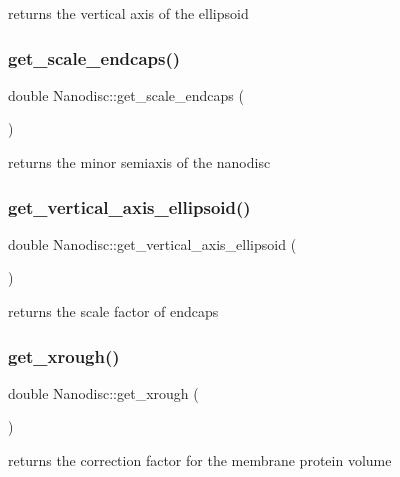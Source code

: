 returns the vertical axis of the ellipsoid \mbox{\label{class_nanodisc_ac6f2cccbdec425c9a4fc59d11393bcd1}} 
\subsubsection{\texorpdfstring{get\_scale\_endcaps()}{get\_scale\_endcaps()}}
{\footnotesize\ttfamily double Nanodisc\+::get\+\_\+scale\+\_\+endcaps (\begin{DoxyParamCaption}{ }\end{DoxyParamCaption})}

returns the minor semiaxis of the nanodisc \mbox{\label{class_nanodisc_ad395bb670a6d45f4579f57a7ff1ee93f}} 
\subsubsection{\texorpdfstring{get\_vertical\_axis\_ellipsoid()}{get\_vertical\_axis\_ellipsoid()}}
{\footnotesize\ttfamily double Nanodisc\+::get\+\_\+vertical\+\_\+axis\+\_\+ellipsoid (\begin{DoxyParamCaption}{ }\end{DoxyParamCaption})}

returns the scale factor of endcaps \mbox{\label{class_nanodisc_af6c81e273d1d7eaf445bec0542024c9c}} 
\subsubsection{\texorpdfstring{get\_xrough()}{get\_xrough()}}
{\footnotesize\ttfamily double Nanodisc\+::get\+\_\+xrough (\begin{DoxyParamCaption}{ }\end{DoxyParamCaption})}

returns the correction factor for the membrane protein volume \mbox{\label{class_nanodisc_ad515e40b045311510b0bb99383e67443}} 
